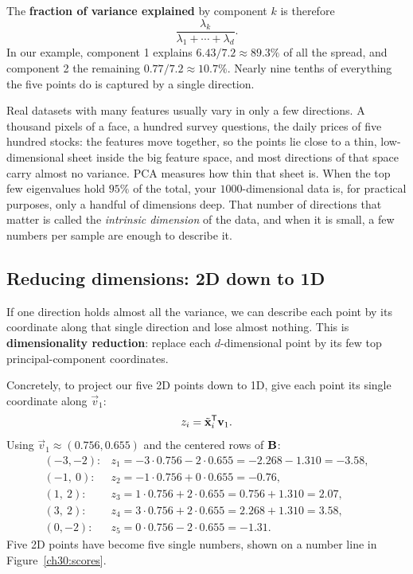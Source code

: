 The \textbf{fraction of variance explained} by component $k$ is therefore
\[
  \frac{\lambda_k}{\lambda_1+\cdots+\lambda_d} .
\]
In our example, component 1 explains $6.43/7.2\approx 89.3\%$ of all the spread,
and component 2 the remaining $0.77/7.2\approx 10.7\%$. Nearly nine tenths of
everything the five points do is captured by a single direction.

\begin{aestheticbox}
Real datasets with many features usually vary in only a few directions. A thousand
pixels of a face, a hundred survey questions, the daily prices of five hundred
stocks: the features move together, so the points lie close to a thin,
low-dimensional sheet inside the big feature space, and most directions of that
space carry almost no variance. PCA measures how thin that sheet is. When the top
few eigenvalues hold $95\%$ of the total, your $1000$-dimensional data is, for
practical purposes, only a handful of dimensions deep. That number of directions
that matter is called the \emph{intrinsic dimension} of the data, and when it is
small, a few numbers per sample are enough to describe it.
\end{aestheticbox}

\subsection{Reducing dimensions: 2D down to 1D}

If one direction holds almost all the variance, we can describe each
point by its coordinate along that single direction and lose almost nothing. This
is \textbf{dimensionality reduction}: replace each $d$-dimensional point by its few
top principal-component coordinates.

Concretely, to project our five 2D points down to 1D, give each point its single
coordinate along $\vec v_1$:
\[
  z_i=\tilde{\mathbf{x}}_i^{\mathsf{T}}\mathbf{v}_1 .
\]
Using $\vec v_1\approx(0.756,0.655)$ and the centered rows of $\mathbf{B}$:
\[
  \begin{array}{rl}
  (-3,-2): & z_1=-3\cdot0.756-2\cdot0.655=-2.268-1.310=-3.58,\\
  (-1,\ 0): & z_2=-1\cdot0.756+0\cdot0.655=-0.76,\\
  (1,\ 2): & z_3=1\cdot0.756+2\cdot0.655=0.756+1.310=2.07,\\
  (3,\ 2): & z_4=3\cdot0.756+2\cdot0.655=2.268+1.310=3.58,\\
  (0,-2): & z_5=0\cdot0.756-2\cdot0.655=-1.31.
  \end{array}
\]
Five 2D points have become five single numbers, shown on a number line in
Figure~\ref{ch30:scores}.

